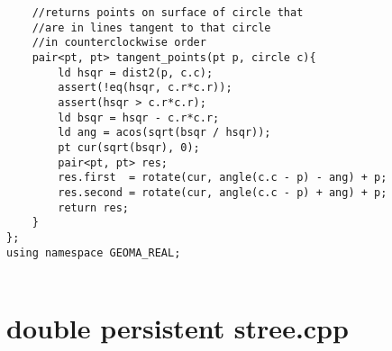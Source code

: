 \documentclass[a4paper,12pt]{report}
\begin{document}
\begin{lstlisting}
    //returns points on surface of circle that
    //are in lines tangent to that circle
    //in counterclockwise order
    pair<pt, pt> tangent_points(pt p, circle c){
        ld hsqr = dist2(p, c.c);
        assert(!eq(hsqr, c.r*c.r));
        assert(hsqr > c.r*c.r);
        ld bsqr = hsqr - c.r*c.r;
        ld ang = acos(sqrt(bsqr / hsqr));
        pt cur(sqrt(bsqr), 0);
        pair<pt, pt> res;
        res.first  = rotate(cur, angle(c.c - p) - ang) + p;
        res.second = rotate(cur, angle(c.c - p) + ang) + p;
        return res;
    }
};
using namespace GEOMA_REAL;


\end{lstlisting}


\section{double persistent stree.cpp}
\end{document}
